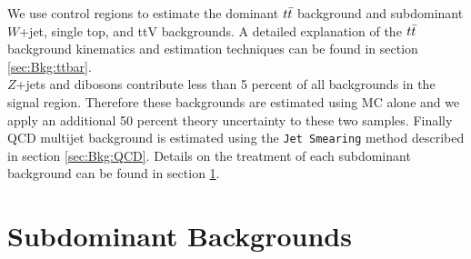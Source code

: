 
\indent We use control regions to estimate the dominant $t\bar{t}$ background and subdominant $W$+jet, single top, and ttV backgrounds.  A detailed explanation of the $t\bar{t}$ background kinematics and estimation techniques can be found in section \ref{sec:Bkg:ttbar}.  \\

\indent $Z$+jets and dibosons contribute less than 5 percent of all backgrounds in the signal region.  Therefore these backgrounds are estimated using MC alone and we apply an additional 50 percent theory uncertainty to these two samples.  Finally QCD multijet background is estimated using the {\tt Jet Smearing} method described in section \ref{sec:Bkg:QCD}.  Details on the treatment of each subdominant background can be found in section \ref{sec:Bkg:sub}.\\





\section{Subdominant Backgrounds}
\label{sec:Bkg:sub}






